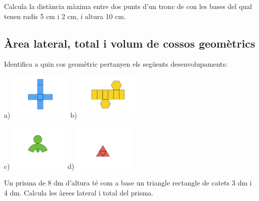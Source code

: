 \begin{activitats}
\begin{mylist}
\exer  Calcula la distància màxima entre dos punts d'un tronc de con les bases del qual tenen radis 5 cm i 2 cm, i altura 10 cm.

 
 
\end{mylist}

\subsection{Àrea lateral, total i volum de cossos geomètrics}
 
\begin{mylist}
\exer Identifica a quin cos geomètric pertanyen els següents desenvolupaments:


a)  \includegraphics[height=2.2cm]{img-11/desenvolupa1}
b) \includegraphics[height=2.2cm]{img-11/desenvolupa2}

c)\includegraphics[height=2.2cm]{img-11/desenvolupa3}
d)\includegraphics[height=2.2cm]{img-11/desenvolupa4}
 

\exer  Un prisma de 8 dm d'altura té com a base un triangle rectangle de catets 3 dm i 4 dm. Calcula les àrees lateral i total del prisma.



\end{mylist}
\end{activitats}
